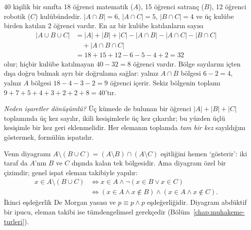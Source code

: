 \begin{ornek}
40 kişilik bir sınıfta 18 öğrenci matematik ($A$), 15 öğrenci satranç ($B$), 12 öğrenci robotik ($C$) kulübündedir. $|A\cap B|=6$, $|A\cap C|=5$, $|B\cap C|=4$ ve üç kulübe birden katılan 2 öğrenci vardır. En az bir kulübe katılanların sayısı
\begin{align*}
|A\cup B\cup C|&=|A|+|B|+|C|-|A\cap B|-|A\cap C|-|B\cap C|\\
&\quad+|A\cap B\cap C|\\
&=18+15+12-6-5-4+2=32
\end{align*}
olur; hiçbir kulübe katılmayan $40-32=8$ öğrenci vardır. Bölge sayılarını içten dışa doğru bulmak ayrı bir doğrulama sağlar: yalnız $A\cap B$ bölgesi $6-2=4$, yalnız $A$ bölgesi $18-4-3-2=9$ öğrenci içerir. Sekiz bölgenin toplamı $9+7+5+4+3+2+2+8=40$’tır.

\smallskip
\emph{Neden işaretler dönüşümlü?} Üç kümede de bulunan bir öğrenci $|A|+|B|+|C|$ toplamında üç kez sayılır, ikili kesişimlerle üç kez çıkarılır; bu yüzden üçlü kesişimle bir kez geri eklenmelidir. Her elemanın toplamda \emph{tam bir kez} sayıldığını göstermek, formülün ispatıdır.
\end{ornek}

\begin{ornek}
Venn diyagramı $A\setminus(B\cup C)=(A\setminus B)\cap(A\setminus C)$ eşitliğini hemen ‘gösterir’: iki taraf da $A$’nın $B$ ve $C$ dışında kalan tek bölgesidir. Ama diyagram özel bir çizimdir; genel ispat eleman takibiyle yapılır:
\begin{align*}
x\in A\setminus(B\cup C)&\iff x\in A\wedge\neg(x\in B\vee x\in C)\\
&\iff (x\in A\wedge x\notin B)\wedge(x\in A\wedge x\notin C).
\end{align*}
İkinci eşdeğerlik De Morgan yasası ve $p\equiv p\wedge p$ eşdeğerliğidir. Diyagram abdüktif bir ipucu, eleman takibi ise tümdengelimsel gerekçedir (Bölüm~\ref{chap:muhakeme-turleri}).
\end{ornek}


